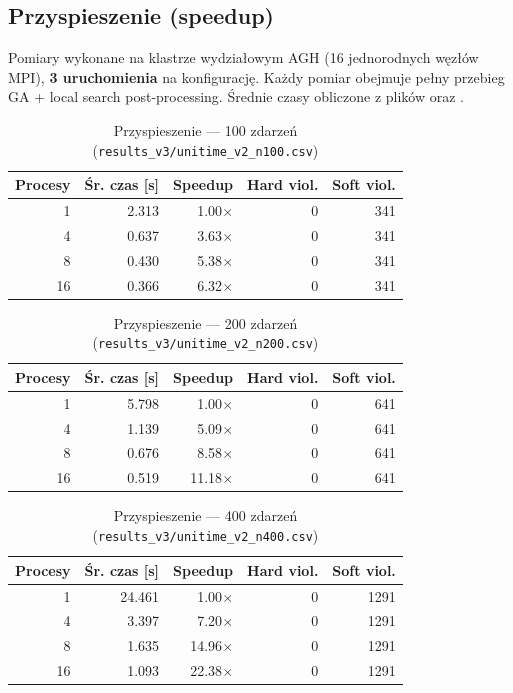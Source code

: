 \documentclass{common/sprawozdanie-agh}
\begin{document}
\subsection{Przyspieszenie (speedup)}

Pomiary wykonane na klastrze wydziałowym AGH (16 jednorodnych węzłów MPI), \textbf{3 uruchomienia} na konfigurację. Każdy pomiar obejmuje pełny przebieg GA + local search post-processing. Średnie czasy obliczone z plików  oraz .

\begin{table}[H]
\centering
\begin{tabular}{rrrrr}
\toprule
\textbf{Procesy} & \textbf{Śr. czas [s]} & \textbf{Speedup} & \textbf{Hard viol.} & \textbf{Soft viol.} \\
\midrule
1  & 2.313 & 1.00$\times$  & 0 & 341 \\
4  & 0.637 & 3.63$\times$  & 0 & 341 \\
8  & 0.430 & 5.38$\times$  & 0 & 341 \\
16 & 0.366 & 6.32$\times$  & 0 & 341 \\
\bottomrule
\end{tabular}
\caption{Przyspieszenie --- 100 zdarzeń (\texttt{results\_v3/unitime\_v2\_n100.csv})}
\label{tab:speedup100}
\end{table}

\begin{table}[H]
\centering
\begin{tabular}{rrrrr}
\toprule
\textbf{Procesy} & \textbf{Śr. czas [s]} & \textbf{Speedup} & \textbf{Hard viol.} & \textbf{Soft viol.} \\
\midrule
1  & 5.798 & 1.00$\times$  & 0 & 641 \\
4  & 1.139 & 5.09$\times$  & 0 & 641 \\
8  & 0.676 & 8.58$\times$  & 0 & 641 \\
16 & 0.519 & 11.18$\times$ & 0 & 641 \\
\bottomrule
\end{tabular}
\caption{Przyspieszenie --- 200 zdarzeń (\texttt{results\_v3/unitime\_v2\_n200.csv})}
\label{tab:speedup200}
\end{table}

\begin{table}[H]
\centering
\begin{tabular}{rrrrr}
\toprule
\textbf{Procesy} & \textbf{Śr. czas [s]} & \textbf{Speedup} & \textbf{Hard viol.} & \textbf{Soft viol.} \\
\midrule
1  & 24.461 & 1.00$\times$   & 0 & 1291 \\
4  &  3.397 & 7.20$\times$   & 0 & 1291 \\
8  &  1.635 & 14.96$\times$  & 0 & 1291 \\
16 &  1.093 & 22.38$\times$  & 0 & 1291 \\
\bottomrule
\end{tabular}
\caption{Przyspieszenie --- 400 zdarzeń (\texttt{results\_v3/unitime\_v2\_n400.csv})}
\label{tab:speedup400}
\end{table}
\end{document}
